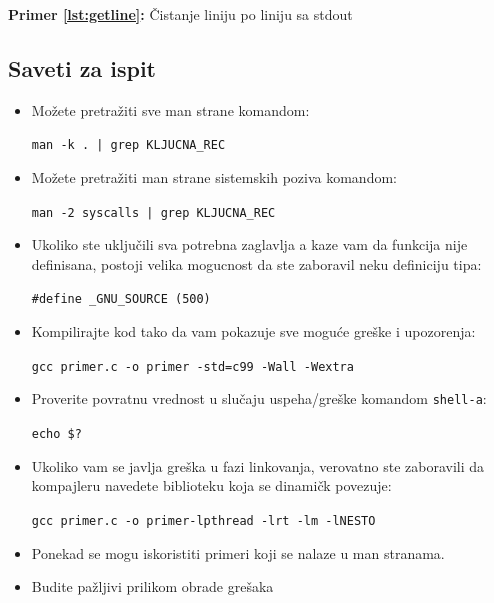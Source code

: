 \documentclass[a4paper, 11pt]{article}
\newcommand{\scode}[3] {
	\hspace{.06\textwidth} 
	\begin{minipage}[t]{.88\textwidth} %
		\begin{mdframed}[topline=true,bottomline=true,leftline=true,rightline=true,backgroundcolor=gray!22, linecolor=gray!60!black,roundcorner=1mm]
			 

	\begin{center}
		\caption{\textbf{Primer \ref{lst:#3}:} #2}
	\end{center}
	\end{mdframed}
	\end{minipage}

}
\begin{document}
\scode{getline.c}{Čistanje liniju po liniju sa stdout}{getline}

\subsection{Saveti za ispit}

\begin{itemize}
	\item{Možete pretražiti sve man strane komandom: \\ \vspace{-3mm} \begin{center}\texttt{man -k . | grep KLJUCNA\_REC}\end{center}}
			\vspace{1mm} 
	\item{Možete pretražiti man strane sistemskih poziva komandom: \\ \vspace{-3mm} \begin{center}\texttt{man -2 syscalls | grep KLJUCNA\_REC}\end{center}}
			\vspace{1mm} 
		\item{Ukoliko ste uključili sva potrebna zaglavlja a kaze vam da funkcija nije definisana, postoji velika mogucnost da ste zaboravil neku definiciju tipa: \\ \vspace{-3mm} \begin{center}\texttt{\#define \_GNU\_SOURCE (500)}\end{center}}
			\vspace{1mm} 
	\item{Kompilirajte kod tako da vam pokazuje sve moguće greške i upozorenja: \\ \vspace{-3mm} \begin{center}\texttt{gcc primer.c -o primer -std=c99 -Wall -Wextra}\end{center}}
			\vspace{1mm} 
	\item{Proverite povratnu vrednost u slučaju uspeha/greške komandom \texttt{shell-a}: \\ \vspace{-3mm} \begin{center}\texttt{echo \$?}\end{center}}
			\vspace{1mm} 
	\item{Ukoliko vam se javlja greška u fazi linkovanja, verovatno ste zaboravili da kompajleru navedete biblioteku koja se dinamičk povezuje: \\ \vspace{-3mm} \begin{center}\texttt{gcc primer.c -o primer-lpthread -lrt -lm -lNESTO}\end{center}}
			\vspace{1mm} 
		\item{Ponekad se mogu iskoristiti primeri koji se nalaze u man stranama.}
			\vspace{1mm} 
			\item{Budite pažljivi prilikom obrade grešaka}
\end{itemize}
\end{document}

